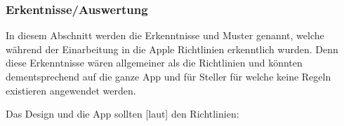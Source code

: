 \subsubsection{Erkentnisse/Auswertung}\myTodo\label{subsection:design:erkenntnisse}%
In diesem Abschnitt werden die Erkenntnisse und Muster genannt, welche während der Einarbeitung in die Apple Richtlinien erkenntlich wurden.\newline%
Denn diese Erkenntnisse wären allgemeiner als die Richtlinien und könnten dementsprechend auf die ganze App und für Steller für welche keine Regeln existieren angewendet werden.\newline%

Das Design und die App sollten [laut] den Richtlinien:

